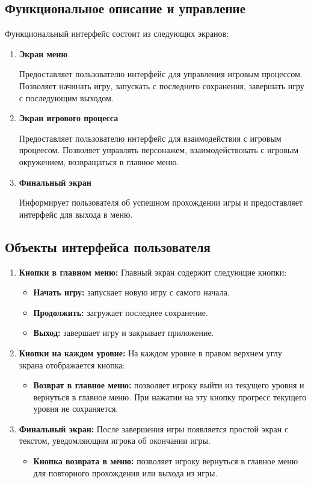 \documentclass{article}
\begin{document}
\subsection*{Функциональное описание и управление}
Функциональный интерфейс состоит из следующих экранов:
\begin{enumerate}
  \item \textbf{Экран меню} \par
      Предоставляет пользователю интерфейс для управления игровым процессом. Позволяет начинать игру, запускать с последнего сохранения, завершать игру с последующим выходом.
  \item \textbf{Экран игрового процесса} \par
      Предоставляет пользователю интерфейс для взаимодействия с игровым процеесом. Позволяет управлять персонажем, взаимодействовать с игровым окружением, возвращаться в главное меню.
  \item \textbf{Финальный экран}\par
      Информирует пользователя об успешном прохождении игры и предоставляет интерфейс для выхода в меню.
\end{enumerate}

\subsection*{Объекты интерфейса пользователя}

\begin{enumerate}
    \item \textbf{Кнопки в главном меню:}  
    Главный экран содержит следующие кнопки:  
    \begin{itemize}
        \item \textbf{Начать игру:} запускает новую игру с самого начала.  
        \item \textbf{Продолжить:} загружает последнее сохранение.  
        \item \textbf{Выход:} завершает игру и закрывает приложение.  
    \end{itemize}

    \item \textbf{Кнопки на каждом уровне:}  
    На каждом уровне в правом верхнем углу экрана отображается кнопка:  
    \begin{itemize}
        \item \textbf{Возврат в главное меню:} позволяет игроку выйти из текущего уровня и вернуться в главное меню. При нажатии на эту кнопку прогресс текущего уровня не сохраняется.  
    \end{itemize}

    \item \textbf{Финальный экран:}  
    После завершения игры появляется простой экран с текстом, уведомляющим игрока об окончании игры.  
    \begin{itemize}
        \item \textbf{Кнопка возврата в меню:} позволяет игроку вернуться в главное меню для повторного прохождения или выхода из игры.  
    \end{itemize}
\end{enumerate}
\end{document}
